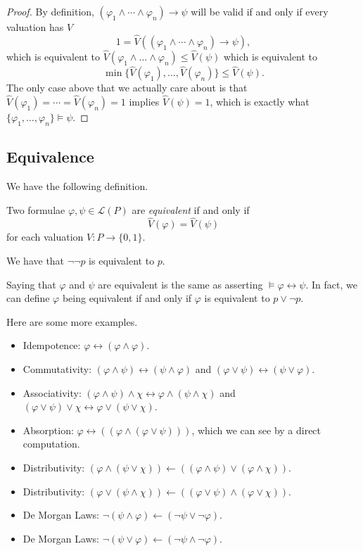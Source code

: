 \begin{proof}
	By definition, $(\varphi_1\land\cdots\land\varphi_n)\to\psi$ will be valid if and only if every valuation has $V$
	\[1=\hat V((\varphi_1\land\cdots\land\varphi_n)\to\psi),\]
	which is equivalent to $\hat V(\varphi_1\land\dots\land\varphi_n)\le\hat V(\psi)$ which is equivalent to
	\[\min\{\hat V(\varphi_1),\ldots,\hat V(\varphi_n)\}\le\hat V(\psi).\]
	The only case above that we actually care about is that $\hat V(\varphi_1)=\cdots=\hat V(\varphi_n)=1$ implies $\hat V(\psi)=1$, which is exactly what $\{\varphi_1,\ldots,\varphi_n\}\models\psi$.
\end{proof}

\subsection{Equivalence}
We have the following definition.
\begin{definition}[Equivalence]
	Two formulae $\varphi,\psi\in\mathcal L(P)$ are \textit{equivalent} if and only if
	\[\hat V(\varphi)=\hat V(\psi)\]
	for each valuation $V:P\to\{0,1\}$.
\end{definition}
\begin{example}
	We have that $\lnot\lnot p$ is equivalent to $p$.
\end{example}
\begin{remark}
	Saying that $\varphi$ and $\psi$ are equivalent is the same as asserting $\models\varphi\leftrightarrow\psi$. In fact, we can define $\varphi$ being equivalent if and only if $\varphi$ is equivalent to $p\lor\lnot p$.
\end{remark}
Here are some more examples.
\begin{itemize}
	\item Idempotence: $\varphi\leftrightarrow(\varphi\land\varphi)$.
	\item Commutativity: $(\varphi\land\psi)\leftrightarrow(\psi\land\varphi)$ and $(\varphi\lor\psi)\leftrightarrow(\psi\lor\varphi)$.
	\item Associativity: $(\varphi\land\psi)\land\chi\leftrightarrow\varphi\land(\psi\land\chi)$ and $(\varphi\lor\psi)\lor\chi\leftrightarrow\varphi\lor(\psi\lor\chi)$.
	\item Absorption: $\varphi\leftrightarrow((\varphi\land(\varphi\lor\psi)))$, which we can see by a direct computation.
	\item Distributivity: $(\varphi\land(\psi\lor\chi))\leftarrow((\varphi\land\psi)\lor(\varphi\land\chi))$.
	\item Distributivity: $(\varphi\lor(\psi\land\chi))\leftarrow((\varphi\lor\psi)\land(\varphi\lor\chi))$.
	\item De Morgan Laws: $\lnot(\psi\land\varphi)\leftarrow(\lnot\psi\lor\lnot\varphi)$.
	\item De Morgan Laws: $\lnot(\psi\lor\varphi)\leftarrow(\lnot\psi\land\lnot\varphi)$.
\end{itemize}